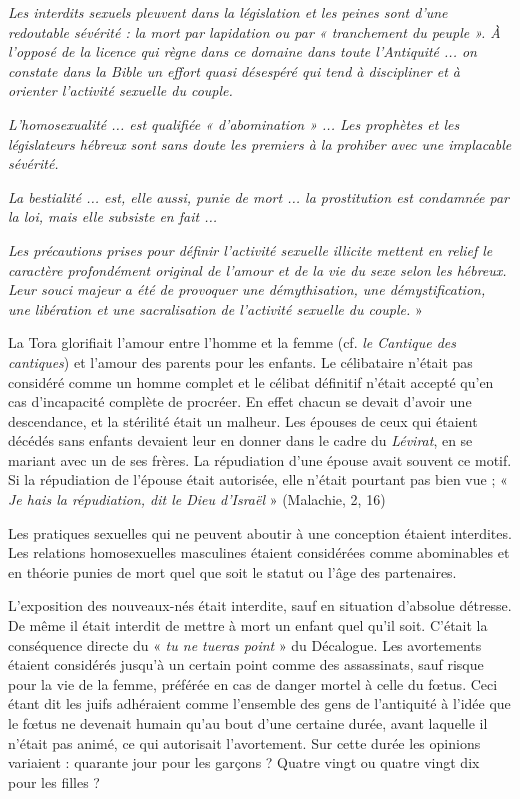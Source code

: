  \emph{ Les interdits sexuels pleuvent dans la législation et les peines sont d'une redoutable sévérité : la mort par lapidation ou par « tranchement du peuple ». À l'opposé de la licence qui règne dans ce domaine dans toute l'Antiquité ... on constate dans la Bible un effort quasi désespéré qui tend à discipliner et à orienter l'activité sexuelle du couple.}

 \emph{L'homosexualité ... est qualifiée « d'abomination » ... Les prophètes et les législateurs hébreux sont sans doute les premiers à la prohiber avec une implacable sévérité.}

 \emph{La bestialité ... est, elle aussi, punie de mort ... la prostitution est condamnée par la loi, mais elle subsiste en fait ...}

 \emph{Les précautions prises pour définir l'activité sexuelle illicite mettent en relief le caractère profondément original de l'amour et de la vie du sexe selon les hébreux. Leur souci majeur a été de provoquer une démythisation, une démystification, une libération et une sacralisation de l'activité sexuelle du couple.} »

 La Tora glorifiait l'amour entre l'homme et la femme (cf. \emph{le Cantique des cantiques}) et l'amour des parents pour les enfants. Le célibataire n'était pas considéré comme un homme complet et le célibat définitif n'était accepté qu'en cas d'incapacité complète de procréer. En effet chacun se devait d'avoir une descendance, et la stérilité était un malheur. Les épouses de ceux qui étaient décédés sans enfants devaient leur en donner dans le cadre du \emph{Lévirat}, en se mariant avec un de ses frères. La répudiation d'une épouse avait souvent ce motif. Si la répudiation de l'épouse était autorisée, elle n'était pourtant pas bien vue ; « \emph{Je hais la répudiation, dit le Dieu d'Israël} » (Malachie, 2, 16)

 Les pratiques sexuelles qui ne peuvent aboutir à une conception étaient interdites. Les relations homosexuelles masculines étaient considérées comme abominables et en théorie punies de mort quel que soit le statut ou l'âge des partenaires. 

 L'exposition des nouveaux-nés était interdite, sauf en situation d'absolue détresse. De même il était interdit de mettre à mort un enfant quel qu'il soit. C'était la conséquence directe du « \emph{tu ne tueras point} » du Décalogue. Les avortements étaient considérés jusqu'à un certain point comme des assassinats, sauf risque pour la vie de la femme, préférée en cas de danger mortel à celle du fœtus. Ceci étant dit les juifs adhéraient comme l'ensemble des gens de l'antiquité à l'idée que le fœtus ne devenait humain qu'au bout d'une certaine durée, avant laquelle il n'était pas animé, ce qui autorisait l'avortement. Sur cette durée les opinions variaient : quarante jour pour les garçons ? Quatre vingt ou quatre vingt dix pour les filles ? 

